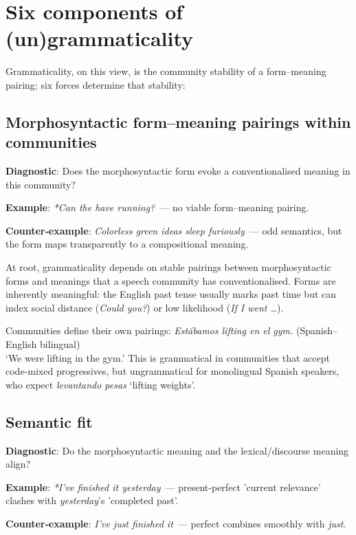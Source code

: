 \documentclass[12pt]{article}
\begin{document}
\section{Six components of (un)grammaticality}

Grammaticality, on this view, is the community stability of a form–meaning pairing; six forces determine that stability:


\subsection{Morphosyntactic form–meaning pairings within communities}

\begin{tcolorbox}[colback=lsLightBlue!30]
\textbf{Diagnostic}: Does the morphosyntactic form evoke a conventionalised meaning in this community?

\textbf{Example}: \textit{*Can the have running?}~— no viable form–meaning pairing.

\textbf{Counter‑example}: \textit{Colorless green ideas sleep furiously}~— odd semantics, but the form maps transparently to a compositional meaning.
\end{tcolorbox}

At root, grammaticality depends on stable pairings between morphosyntactic forms and meanings that a speech community has conventionalised. Forms are inherently meaningful: the English past tense usually marks past time but can index social distance (\textit{Could you?}) or low likelihood (\textit{If I went …}).

Communities define their own pairings:
\ea
\textit{Estábamos lifting en el gym.} (Spanish–English bilingual)\\
`We were lifting in the gym.'
\z
This is grammatical in communities that accept code‑mixed progressives, but ungrammatical for monolingual Spanish speakers, who expect \textit{levantando pesas} `lifting weights'.

\subsection{Semantic fit}

\begin{tcolorbox}[colback=lsLightBlue!30]
\textbf{Diagnostic}: Do the morphosyntactic meaning and the lexical/discourse meaning align?

\textbf{Example}: \textit{*I've finished it yesterday}~— present‑perfect 'current relevance' clashes with \textit{yesterday}'s 'completed past'.

\textbf{Counter‑example}: \textit{I've just finished it}~— perfect combines smoothly with \textit{just}.
\end{tcolorbox}
\end{document}
